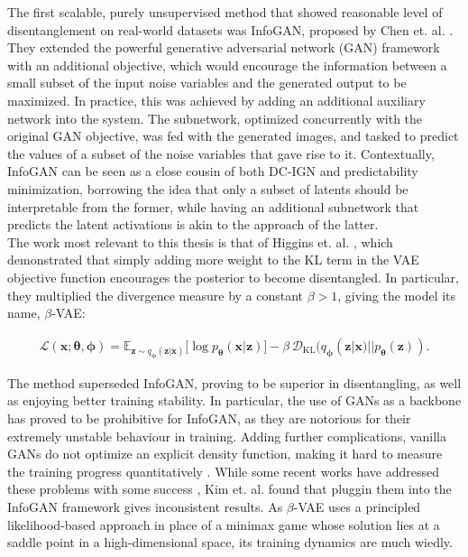 \documentclass{report}
\begin{document}
\noindent The first scalable, purely unsupervised method that showed reasonable level of disentanglement on real-world datasets was InfoGAN, proposed by Chen et. al. \cite{infogan}. They extended the powerful generative adversarial network (GAN) framework \cite{gan} with an additional objective, which would encourage the information between a small subset of the input noise variables and the generated output to be maximized. In practice, this was achieved by adding an additional auxiliary network into the system. The subnetwork, optimized concurrently with the original GAN objective, was fed with the generated images, and tasked to predict the values of a subset of the noise variables that gave rise to it. Contextually, InfoGAN can be seen as a close cousin of both DC-IGN and predictability minimization, borrowing the idea that only a subset of latents should be interpretable from the former, while having an additional subnetwork that predicts the latent activations is akin to the approach of the latter. \\

\noindent The work most relevant to this thesis is that of Higgins et. al. \cite{beta-vae}, which demonstrated that simply adding more weight to the KL term in the VAE objective function encourages the posterior to become disentangled. In particular, they multiplied the divergence measure by a constant $\beta > 1$, giving the model its name, $\beta$-VAE:

\begin{equation}
\begin{gathered}
\mathcal{L}(\boldsymbol{x}; \boldsymbol{\theta}, \boldsymbol{\phi}) =
\mathbb{E}_{\boldsymbol{z} \sim q_{\boldsymbol{\phi}}(\boldsymbol{z}|\boldsymbol{x})} \big[ \log p_{\boldsymbol{\theta}} (\boldsymbol{x} | \boldsymbol{z}) \big] - \beta \, \mathcal{D}_\text{KL}(q_{\boldsymbol{\phi}}(\boldsymbol{z}|\boldsymbol{x}) || p_{\boldsymbol{\theta}}(\boldsymbol{z})).
\end{gathered}
\label{eq:beta-vae}
\end{equation}

\bigskip

\noindent The method superseded InfoGAN, proving to be superior in disentangling, as well as enjoying better training stability. In particular, the use of GANs as a backbone has proved to be prohibitive for InfoGAN, as they are notorious for their extremely unstable behaviour in training. Adding further complications, vanilla GANs do not optimize an explicit density function, making it hard to measure the training progress quantitatively \cite{gan-tutorial}. While some recent works have addressed these problems with some success \cite{wgan, wgan-gp, began}, Kim et. al. \cite{factor-vae} found that pluggin them into the InfoGAN framework gives inconsistent results. As $\beta$-VAE uses a principled likelihood-based approach in place of a minimax game whose solution lies at a saddle point in a high-dimensional space, its training dynamics are much wiedly. \\
\end{document}
